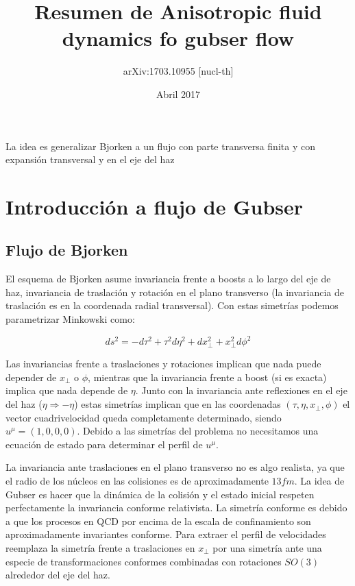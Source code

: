 \documentclass[11pt,a4paper]{article}
\begin{document}
\title{\Huge Resumen de Anisotropic fluid dynamics fo gubser flow}
\author{\huge  arXiv:1703.10955 [nucl-th]}





\date{Abril 2017}

\renewcommand{\headrulewidth}{0.5pt}




\maketitle

La idea es generalizar Bjorken a un flujo con parte transversa finita y con expansión transversal y en el eje del haz

\section{Introducción a flujo de Gubser}

\subsection{Flujo de Bjorken}
El esquema de Bjorken asume invariancia frente a boosts a lo largo del eje de haz, invariancia de traslación y rotación en el plano transverso (la invariancia de traslación es en la coordenada radial transversal). Con estas simetrías podemos parametrizar Minkowski como:

\begin{equation}
ds^2=-d{\tau}^2+{\tau}^2d{\eta}^2+dx^{2}_{\bot}+x^{2}_{\bot}d{\phi}^2
\end{equation}

Las invariancias frente a traslaciones y rotaciones implican que nada puede depender de $x_{\bot}$ o ${\phi}$, mientras que la invariancia frente a boost (si es exacta) implica que nada depende de $\eta$. Junto con la invariancia ante reflexiones en el eje del haz ($\eta\Rightarrow-\eta$) estas simetrías implican que en las coordenadas $(\tau,\eta,x_{\bot},\phi)$ el vector cuadrivelocidad queda completamente determinado, siendo $u^{\mu}=(1,0,0,0)$. Debido a las simetrías del problema no necesitamos una ecuación de estado para determinar el perfil de $u^{\mu}$.

La invariancia ante traslaciones en el plano transverso no es algo realista, ya que el radio de los núcleos en las colisiones es de aproximadamente $13 fm$. La idea de Gubser es hacer que la dinámica de la colisión y el estado inicial respeten perfectamente la invariancia conforme relativista. La simetría conforme es debido a que los procesos en QCD por encima de la escala de confinamiento son aproximadamente invariantes conforme. Para extraer el perfil de velocidades reemplaza la simetría frente a traslaciones en $x_{\bot}$ por una simetría ante una especie de transformaciones conformes combinadas con rotaciones $SO(3)$ alrededor del eje del haz.
\end{document}
